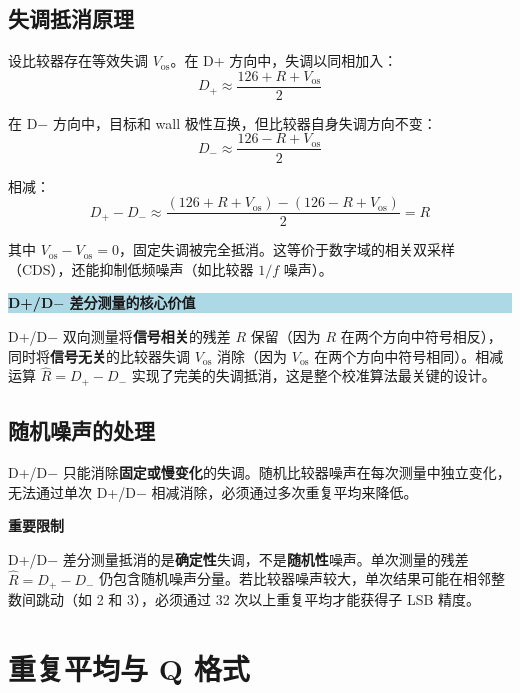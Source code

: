 \documentclass[
  UTF8,
  a4paper,
  11pt,
  oneside,
  fontset=fandol
]{ctexrep}
\newenvironment{keybox}[1]{%
  \begin{center}
  \begin{minipage}{0.94\textwidth}
  \colorbox{lightblue}{%
    \parbox{0.96\textwidth}{\textbf{#1}}}
  \vspace{0.35em}\par
}{%
  \end{minipage}
  \end{center}
}
\newenvironment{warnbox}[1]{%
  \begin{center}
  \begin{minipage}{0.94\textwidth}
  \colorbox{lightorange}{%
    \parbox{0.96\textwidth}{\textbf{#1}}}
  \vspace{0.35em}\par
}{%
  \end{minipage}
  \end{center}
}
\newcommand{\Rhat}{\widehat{R}}
\begin{document}
\section{失调抵消原理}

设比较器存在等效失调 $V_{\mathrm{os}}$。在 D+ 方向中，失调以同相加入：
\begin{equation}
D_+ \approx \frac{126 + R + V_{\mathrm{os}}}{2}
\end{equation}

在 D$-$ 方向中，目标和 wall 极性互换，但比较器自身失调方向不变：
\begin{equation}
D_- \approx \frac{126 - R + V_{\mathrm{os}}}{2}
\end{equation}

相减：
\begin{equation}
D_+ - D_- \approx \frac{(126 + R + V_{\mathrm{os}}) - (126 - R + V_{\mathrm{os}})}{2} = R
\end{equation}

其中 $V_{\mathrm{os}} - V_{\mathrm{os}} = 0$，固定失调被完全抵消。这等价于数字域的相关双采样（CDS），还能抑制低频噪声（如比较器 $1/f$ 噪声）。

\begin{keybox}{D+/D$-$ 差分测量的核心价值}
D+/D$-$ 双向测量将\textbf{信号相关}的残差 $R$ 保留（因为 $R$ 在两个方向中符号相反），同时将\textbf{信号无关}的比较器失调 $V_{\mathrm{os}}$ 消除（因为 $V_{\mathrm{os}}$ 在两个方向中符号相同）。相减运算 $\Rhat = D_+ - D_-$ 实现了完美的失调抵消，这是整个校准算法最关键的设计。
\end{keybox}

\section{随机噪声的处理}

D+/D$-$ 只能消除\textbf{固定或慢变化}的失调。随机比较器噪声在每次测量中独立变化，无法通过单次 D+/D$-$ 相减消除，必须通过多次重复平均来降低。

\begin{warnbox}{重要限制}
D+/D$-$ 差分测量抵消的是\textbf{确定性}失调，不是\textbf{随机性}噪声。单次测量的残差 $\Rhat = D_+ - D_-$ 仍包含随机噪声分量。若比较器噪声较大，单次结果可能在相邻整数间跳动（如 2 和 3），必须通过 32 次以上重复平均才能获得子 LSB 精度。
\end{warnbox}

\chapter{重复平均与 Q 格式}
\end{document}
